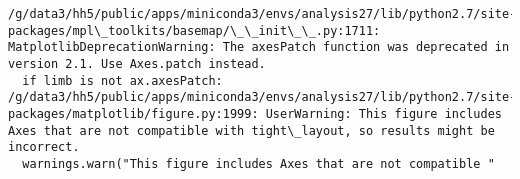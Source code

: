 \documentclass[11pt]{article}
\begin{document}
    \begin{Verbatim}[commandchars=\\\{\}]
/g/data3/hh5/public/apps/miniconda3/envs/analysis27/lib/python2.7/site-packages/mpl\_toolkits/basemap/\_\_init\_\_.py:1711: MatplotlibDeprecationWarning: The axesPatch function was deprecated in version 2.1. Use Axes.patch instead.
  if limb is not ax.axesPatch:
/g/data3/hh5/public/apps/miniconda3/envs/analysis27/lib/python2.7/site-packages/matplotlib/figure.py:1999: UserWarning: This figure includes Axes that are not compatible with tight\_layout, so results might be incorrect.
  warnings.warn("This figure includes Axes that are not compatible "

    \end{Verbatim}

    \begin{center}
    \end{center}
    { \hspace*{\fill} \\}
    
\end{document}
